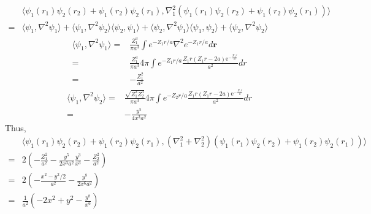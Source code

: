 \begin{align*}
    &\langle \psi_1(r_1)\psi_2(r_2)
    +\psi_1(r_2)\psi_2(r_1),
    \nabla^2_1
    (\psi_1(r_1)\psi_2(r_2)
    +\psi_1(r_2)\psi_2(r_1))
    \rangle\\
    =&
    \langle\psi_1,\nabla^2\psi_1\rangle
    +\langle\psi_1,\nabla^2\psi_2\rangle
    \langle\psi_2,\psi_1\rangle+
\langle\psi_2,\nabla^2\psi_1\rangle
\langle\psi_1,\psi_2\rangle
+    \langle\psi_2,\nabla^2\psi_2\rangle
\end{align*}
\begin{align*}
    \langle\psi_1,\nabla^2\psi_1\rangle
    =&
    \frac{Z_1^3}{\pi a^3}
    \int e^{-Z_1r/a}
    \nabla^2 e^{-Z_1r/a}d\bm r\\
    =&
    \frac{Z_1^3}{\pi a^3}4\pi
    \int e^{-Z_1r/a}
    \frac{Z_{1} r \left(Z_{1} r - 2a\right) \mathrm{e}^{-\frac{Z_{1} r}{a}}}{a^{2}}dr\\
    =&-\frac{Z_1^2}{a^2}
\end{align*}
\begin{align*}
    \langle\psi_1,\nabla^2\psi_2\rangle=&
    \frac{\sqrt{Z_1^3Z_2^3}}{\pi a^3}4\pi
    \int e^{-Z_2r/a}
    \frac{Z_{1} r \left(Z_{1} r - 2a\right) \mathrm{e}^{-\frac{Z_{1} r}{a}}}{a^{2}}dr\\
    =&
    -\frac{y^5}{4x^3a^2}
\end{align*}
Thus,
\begin{align*}
    &\langle \psi_1(r_1)\psi_2(r_2)
    +\psi_1(r_2)\psi_2(r_1),
    (\nabla^2_1+\nabla^2_2)
    (\psi_1(r_1)\psi_2(r_2)
    +\psi_1(r_2)\psi_2(r_1))
    \rangle\\
    =&
    2\left(
    -\frac{Z_1^2}{a^2}
    -\frac{y^5}{2x^3a^2}
    \frac{y^3}{x^3}
    -\frac{Z_2^2}{a^2}
    \right)\\
    =&
     2\left(
    -\frac{x^2-y^2/2}{a^2}
    -\frac{y^8}{2x^6a^2}
    \right)\\
    =&
    \frac{1}{a^2}
    \left(
    -2x^2+y^2 - \frac{y^8}{x^6}
    \right)
\end{align*}


